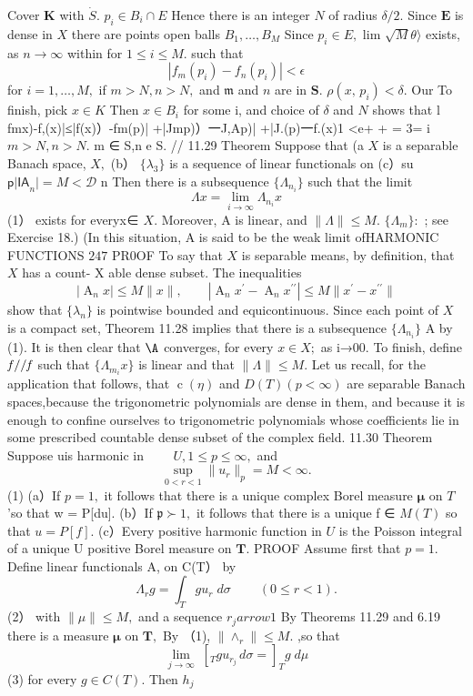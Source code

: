 Cover ${\boldsymbol{K}}$ with ${\dot{S}}.$ $p_{i}\in B_{i}\cap E$ Hence there is an integer ${\mathbf{}}N$ of radius $\delta/2.$ Since $\boldsymbol{E}$ is dense in $X$ there are points open balls $B_{1},\ldots,B_{M}$ Since $p_{i}\in E,$ lim $\scriptstyle{\sqrt{M}}\scriptstyle\theta\rangle$ exists, as $n\to\infty$ within for $1\leq i\leq M.$ such that $$ |f_{m}(p_{i})-f_{n}(p_{i})|<\epsilon $$ for $i=1,\ldots,M,$ if $m>N,n>N,$ and ${\mathfrak{m}}$ and $\scriptstyle n$ are in ${\boldsymbol{S}}.$ $\rho(x,\,p_{i})<\delta.$ Our To finish, pick $x\in K$ Then $x\in B_{i}$ for some i, and choice of $\delta$ and ${\mathbf{}}N$ shows that l fmx)-f,(x)|≤|f(x)）-fm(p)| +|Jmp)）一J,Ap)| +|J.(p)一f.(x)1 <e+ + = 3= i $m>N,n>N.$ m ∈ S,n e S. // 11.29 Theorem Suppose that (a $X$ is a separable Banach space, $X,$ (b） $\scriptstyle\{\lambda_{3}\}$ is a sequence of linear functionals on (c）su $\mathsf{p|I A}_{n}|=M<\mathcal{D}$ n Then there is a subsequence $\{\Lambda_{n_{i}}\}$ such that the limit $$ \Lambda x=\operatorname*{lim}_{i\to\infty}\Lambda_{n_{i}}x $$ (1） exists for everyx∈ $X.$ Moreover, A is linear, and $\|\Lambda\|\le M.$ $\{\Lambda_{m}\}{\mathrm{:}}$ ; see Exercise 18.) (In this situation, A is said to be the weak limit ofHARMONIC FUNCTIONS $247$ PR0OF To say that $\textstyle X$ is separable means, by definition, that $\textstyle X$ has a count- X able dense subset. The inequalities $$ |\operatorname{A}_{n}x|\leq M\|x\|,\qquad|\operatorname{A}_{n}x^{\prime}-\operatorname{A}_{n}x^{\prime\prime}|\leq M\|x^{\prime}-x^{\prime\prime}\| $$ show that $\scriptstyle\{\lambda_{n}\}$ is pointwise bounded and equicontinuous. Since each point of $X$ is a compact set, Theorem 11.28 implies that there is a subsequence $\{\Lambda_{n_{i}}\}$ A by (1). It is then clear that $\mathrm{\A}$ converges, for every $x\in X;$ as i→00. To finish, define ${\it f}//{\it f}$ such that $\{\Lambda_{m_{i}}x\}$ is linear and that $\|\Lambda\|\le M.$ Let us recall, for the application that follows, that $\operatorname{c}(\eta)$ and $D(T)\left(p<\infty\right)$ are separable Banach spaces,because the trigonometric polynomials are dense in them, and because it is enough to confine ourselves to trigonometric polynomials whose coefficients lie in some prescribed countable dense subset of the complex field. 11.30 Theorem Suppose uis harmonic in $~~~~~~~~~U,1\leq p\leq\infty,$ and $$ \operatorname*{sup}_{0<r<1}\|u_{r}\|_{p}=M<\infty. $$ (1) (a）If $p=1,$ it follows that there is a unique complex Borel measure ${\boldsymbol{\mu}}$ on ${\mathbf{}}T$ 'so that w = P[du]. (b）If ${\mathfrak{p}}\succ1,$ it follows that there is a unique f ∈ $\scriptstyle{M(T)}$ so that $u=P[f].$ (c）Every positive harmonic function in $U$ is the Poisson integral of a unique U positive Borel measure on ${\boldsymbol{T}}.$ PROOF Assume first that $p=1.$ Define linear functionals A, on C(T） by $$ \Lambda_{r}g=\int_{T}g u_{r}\;d\sigma\;\;\;\;\;\;\;\;(0\leq r<1). $$ (2） with $\|\mu\|\leq M,$ and a sequence $r_{j} arrow1$ By Theorems 11.29 and 6.19 there is a measure ${\boldsymbol{\mu}}$ on ${\boldsymbol{T}},$ By （1), $\|\land_{r}\|\leq M.$ ,so that $$ \operatorname*{lim}_{j\to\infty}\;\left[_{\scriptstyle T}{g u_{r_{j}}}\,d\sigma=\right]_{T}{g}\;d\mu $$ (3) for every $g\in C(T).$ Then $h_{j}$ 